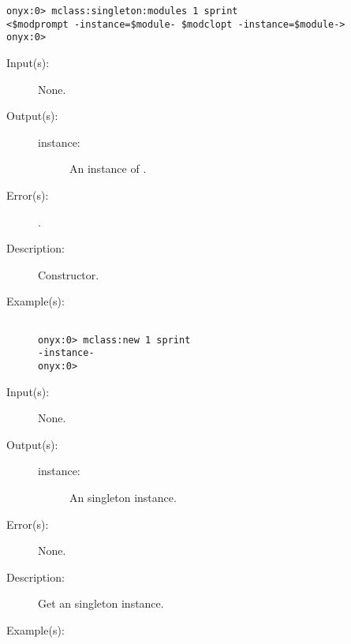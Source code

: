\begin{description}
\begin{description}
\begin{verbatim}
onyx:0> mclass:singleton:modules 1 sprint
<$modprompt -instance=$module- $modclopt -instance=$module->
onyx:0> 
		\end{verbatim}
	\end{description}
\label{mclass:new}
\item[{\onyxop{--}{new}{instance}}: ]
	\begin{description}\item[]
	\item[Input(s): ] None.
	\item[Output(s): ]
		\begin{description}\item[]
		\item[instance: ]
			An instance of .
		\end{description}
	\item[Error(s): ]
		\begin{description}\item[]
		\item[.]
		\end{description}
	\item[Description: ]
		Constructor.
	\item[Example(s): ]\begin{verbatim}

onyx:0> mclass:new 1 sprint
-instance-
onyx:0>
		\end{verbatim}
	\end{description}
\label{mclass:singleton}
\item[{\onyxop{--}{singleton}{instance}}: ]
	\begin{description}\item[]
	\item[Input(s): ] None.
	\item[Output(s): ]
		\begin{description}\item[]
		\item[instance: ]
			An  singleton instance.
		\end{description}
	\item[Error(s): ] None.
	\item[Description: ]
		Get an  singleton instance.
	\item[Example(s): ]\begin{verbatim}


\end{verbatim}
\end{description}
\end{description}
